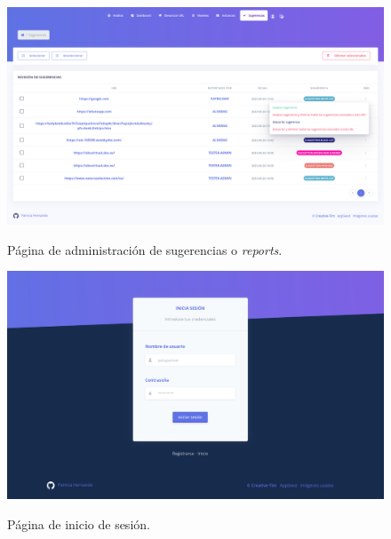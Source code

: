 \begin{figure}[h]
	\caption[Manual de usuario: administrar sugerencias]{Página de administración de sugerencias o \textit{reports}.}
	\centering
	\includegraphics[width=\textwidth]{../img/anexos/user_guide/7_reports}
	\label{e-7:reports}
\end{figure}

\begin{figure}[h]
	\caption[Manual de usuario: inicio de sesión]{Página de inicio de sesión.}
	\centering
	\includegraphics[width=\textwidth]{../img/anexos/user_guide/8_login}
	\label{e-8:login}
\end{figure}

